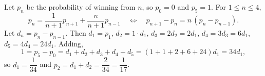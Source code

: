 Let $p_n$ be the probability of winning from $n$, so $p_0=0$ and $p_5=1$. For $1\le n\le4$,
\[
p_n=\dfrac{1}{n+1}p_{n+1}+\dfrac{n}{n+1}p_{n-1}\quad\Longleftrightarrow\quad p_{n+1}-p_n=n\,(p_n-p_{n-1}).
\]
Let $d_n=p_n-p_{n-1}$. Then $d_1=p_1$, $d_2=1\cdot d_1$, $d_3=2d_2=2d_1$, $d_4=3d_3=6d_1$, $d_5=4d_4=24d_1$. Adding,
\[
1=p_5-p_0=d_1+d_2+d_3+d_4+d_5=(1+1+2+6+24)d_1=34d_1 ,
\]
so $d_1=\dfrac{1}{34}$ and $p_2=d_1+d_2=\dfrac{2}{34}=\boxed{\dfrac{1}{17}}$.

